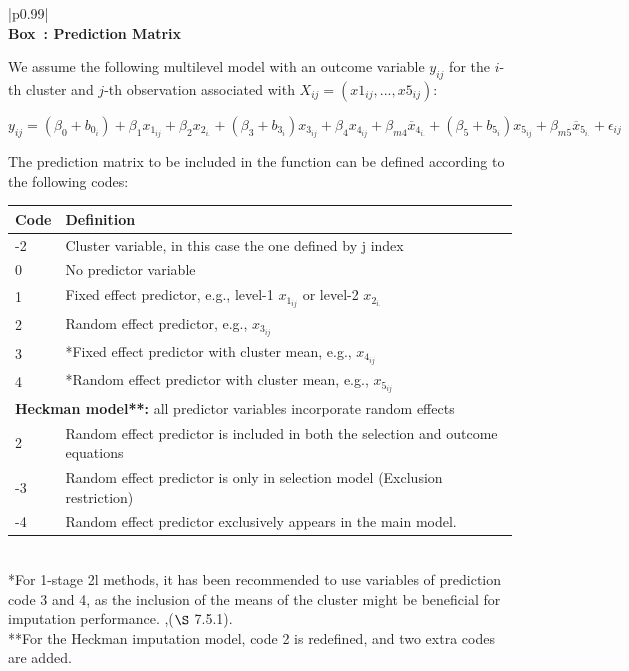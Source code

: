 \documentclass[
  article]{jss}
\newcounter{boxedmanual}
\newenvironment{boxedmanual}[1][]
{\begin{center}
\refstepcounter{boxedmanual}\par\medskip
\begin{tabular}{|p{0.99\textwidth}|}
\hline\\
{\centering\textbf{Box~\theboxedmanual: #1} \rmfamily{\medskip} \\}
}
{
\\\\\hline
\end{tabular}
\end{center}
}
\begin{document}
\begin{boxedmanual}[Prediction Matrix]
\label{box-prediction-matrix}

We assume the following multilevel model with an outcome variable $y_{ij}$ for the $i$-th cluster and $j$-th observation associated with $X_{ij}=(x1_{ij},...,x5_{ij})$:

\begin{equation*}
y_{ij} = (\beta_0 + b_{0_i})+ \beta_1x_{1_{ij}}+\beta_2x_{2_{i.}} +(\beta_3 +  b_{3_i})x_{3_{ij}}
+ \beta_4x_{4_{ij}} + \beta_{m4}\overline{x}_{4_{i.}} +(\beta_5 +  b_{5_i})x_{5_{ij}} +\beta_{m5}\overline{x}_{5_{i.}}+\epsilon_{ij}
\end{equation*}

The prediction matrix to be included in the  function can be defined according to the following codes:

\begin{tabular}{ll}
     \toprule
Code  & Definition \\
  \midrule
-2 & Cluster variable, in this case the one defined by j index  \\  
 0  & No predictor variable \\
 1  & Fixed effect predictor, e.g., level-1  $x_{1_{ij}}$ or  level-2 $x_{2_{i.}}$ \\
 2  & Random effect predictor, e.g., $x_{3_{ij}}$\\
 3  & *Fixed effect predictor with cluster mean, e.g., $x_{4_{ij}}$\\
 4  & *Random effect predictor with cluster mean, e.g., $x_{5_{ij}}$\\

  \midrule 
\multicolumn{2}{l}{\textbf{Heckman model**:} all predictor variables incorporate random effects}\\  
2 & Random effect predictor is included in both the selection and outcome equations\\
-3 & Random effect predictor is only in selection model (Exclusion restriction)\\
-4 & Random effect predictor exclusively appears in the main  model.\\
      \bottomrule
\end{tabular}
\\
*For 1-stage 2l methods, it has been recommended to use variables of prediction code 3 and 4, as the inclusion of the means of the cluster might be beneficial for imputation performance. \citep{mistler2017},\citep{buur18}($\S$ 7.5.1).\\ 
**For the Heckman imputation model, code 2 is redefined, and two extra codes are added.

\end{boxedmanual}
\end{document}
